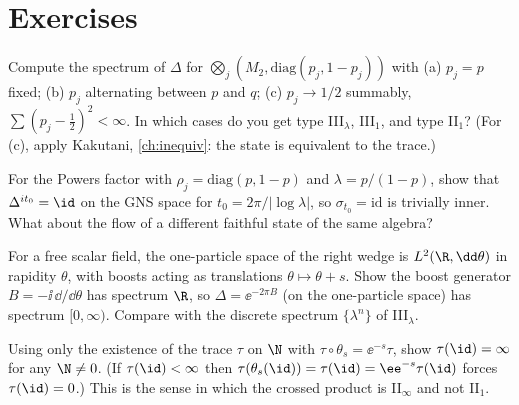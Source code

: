 \section*{Exercises}
\begin{exercise}
Compute the spectrum of $\Delta$ for $\bigotimes_j(M_2,\mathrm{diag}(p_j,1-p_j))$ with (a) $p_j=p$ fixed; (b) $p_j$ alternating between $p$ and $q$; (c) $p_j\to1/2$ summably, $\sum(p_j-\frac12)^2<\infty$. In which cases do you get type III$_\lambda$, III$_1$, and type II$_1$? (For (c), apply Kakutani, \cref{ch:inequiv}: the state is equivalent to the trace.)
\end{exercise}
\begin{exercise}
For the Powers factor with $\rho_j=\mathrm{diag}(p,1-p)$ and $\lambda=p/(1-p)$, show that $\Delta^{it_0}=\id$ on the GNS space for $t_0=2\pi/|\log\lambda|$, so $\sigma_{t_0}=\mathrm{id}$ is trivially inner. What about the flow of a different faithful state of the same algebra?
\end{exercise}
\begin{exercise}
For a free scalar field, the one-particle space of the right wedge is $L^2(\R,\dd\theta)$ in rapidity $\theta$, with boosts acting as translations $\theta\mapsto\theta+s$. Show the boost generator $B=-\ii\,\dd/\dd\theta$ has spectrum $\R$, so $\Delta=\ee^{-2\pi B}$ (on the one-particle space) has spectrum $[0,\infty)$. Compare with the discrete spectrum $\{\lambda^n\}$ of III$_\lambda$.
\end{exercise}
\begin{exercise}
Using only the existence of the trace $\tau$ on $\N$ with $\tau\circ\theta_s=\ee^{-s}\tau$, show $\tau(\id)=\infty$ for any $\N\ne0$. (If $\tau(\id)<\infty$ then $\tau(\theta_s(\id))=\tau(\id)=\ee^{-s}\tau(\id)$ forces $\tau(\id)=0$.) This is the sense in which the crossed product is II$_\infty$ and not II$_1$.
\end{exercise}
